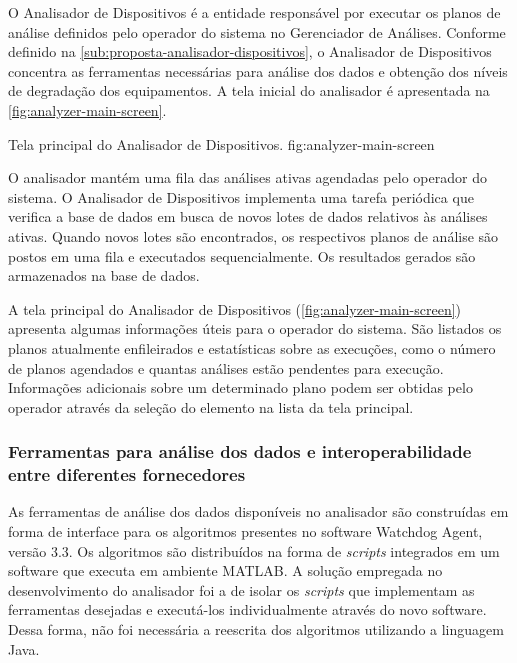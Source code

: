 O Analisador de Dispositivos é a entidade responsável por executar os planos de análise definidos
pelo operador do sistema no Gerenciador de Análises. Conforme definido na
\cref{sub:proposta-analisador-dispositivos}, o Analisador de Dispositivos concentra as ferramentas
necessárias para análise dos dados e obtenção dos níveis de degradação dos equipamentos. A tela
inicial do analisador é apresentada na \cref{fig:analyzer-main-screen}.

  {Tela principal do Analisador de Dispositivos.}
  {fig:analyzer-main-screen}

O analisador mantém uma fila das análises ativas agendadas pelo operador do sistema. O Analisador de
Dispositivos implementa uma tarefa periódica que verifica a base de dados em busca de novos lotes de
dados relativos às análises ativas. Quando novos lotes são encontrados, os respectivos planos de
análise são postos em uma fila e executados sequencialmente. Os resultados gerados são armazenados
na base de dados.

A tela principal do Analisador de Dispositivos (\cref{fig:analyzer-main-screen}) apresenta algumas
informações úteis para o operador do sistema. São listados os planos atualmente enfileirados e
estatísticas sobre as execuções, como o número de planos agendados e quantas análises estão
pendentes para execução. Informações adicionais sobre um determinado plano podem ser obtidas pelo
operador através da seleção do elemento na lista da tela principal.


\subsubsection{Ferramentas para análise dos dados e interoperabilidade entre diferentes
    fornecedores}

As ferramentas de análise dos dados disponíveis no analisador são construídas em forma de interface
para os algoritmos presentes no software Watchdog Agent, versão 3.3. Os algoritmos
são distribuídos na forma de \textit{scripts} integrados em um software que executa em ambiente
MATLAB. A solução empregada no desenvolvimento do analisador foi a de isolar os \textit{scripts} que
implementam as ferramentas desejadas e executá-los individualmente através do novo software. Dessa
forma, não foi necessária a reescrita dos algoritmos utilizando a linguagem Java.

